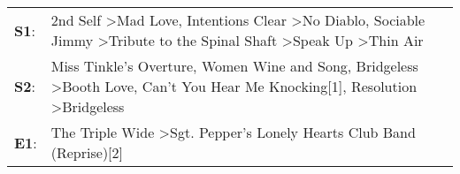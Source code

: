 \begin{supertabular}{p{0.03\textwidth}p{0.92\textwidth}}
 \textbf{S1}:  &  2nd Self\textsuperscript{} \textgreater \enspace Mad Love\textsuperscript{}, \enspace Intentions Clear\textsuperscript{} \textgreater \enspace No Diablo\textsuperscript{}, \enspace Sociable Jimmy\textsuperscript{} \textgreater \enspace Tribute to the Spinal Shaft\textsuperscript{} \textgreater \enspace Speak Up\textsuperscript{} \textgreater \enspace Thin Air\textsuperscript{}  \enspace  \\
 \textbf{S2}:  &                                                       Miss Tinkle's Overture\textsuperscript{}, \enspace Women Wine and Song\textsuperscript{}, \enspace Bridgeless\textsuperscript{} \textgreater \enspace Booth Love\textsuperscript{}, \enspace Can't You Hear Me Knocking[1]\textsuperscript{}, \enspace Resolution\textsuperscript{} \textgreater \enspace Bridgeless\textsuperscript{}  \enspace  \\
 \textbf{E1}:  &                                                                                                                                                                                                                                                                 The Triple Wide\textsuperscript{} \textgreater \enspace Sgt. Pepper's Lonely Hearts Club Band (Reprise)[2]\textsuperscript{}  \enspace  \\
\end{supertabular}
